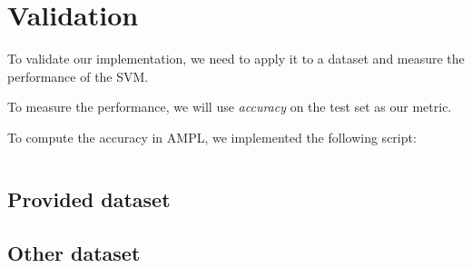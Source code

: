 \chapter{Validation}

To validate our implementation, we
need to apply it to a dataset and measure
the performance of the SVM.

To measure the performance, we will use
\emph{accuracy} on the test set as our metric.

To compute the accuracy in AMPL, we implemented the following
script:
\begin{verbatim}

\end{verbatim}

\section{Provided dataset}

\section{Other dataset}
